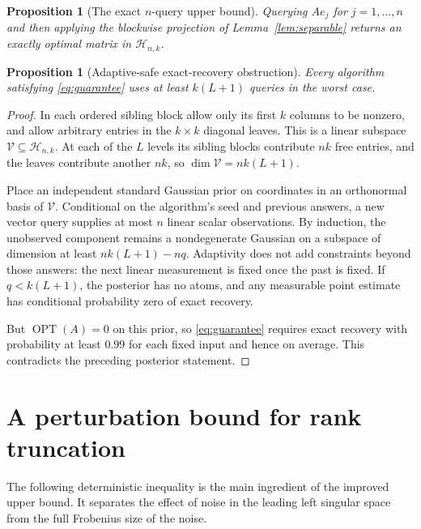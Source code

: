 \documentclass[11pt]{article}
\newtheorem{proposition}[theorem]{Proposition}
\theoremstyle{remark}
\newcommand{\Hclass}{\mathcal H_{n,k}}
\newcommand{\OPT}{\operatorname{OPT}}
\begin{document}
\begin{proposition}[The exact $n$-query upper bound]\label{prop:upper}
Querying $Ae_j$ for $j=1,\ldots,n$ and then applying the blockwise projection
of Lemma~\ref{lem:separable} returns an exactly optimal matrix in $\Hclass$.
\end{proposition}

\begin{proposition}[Adaptive-safe exact-recovery obstruction]\label{prop:exactlower}
Every algorithm satisfying \eqref{eq:guarantee} uses at least $k(L+1)$ queries
in the worst case.
\end{proposition}
\begin{proof}
In each ordered sibling block allow only its first $k$ columns to be nonzero,
and allow arbitrary entries in the $k\times k$ diagonal leaves. This is a
linear subspace $\mathcal V\subseteq\Hclass$. At each of the $L$ levels its
sibling blocks contribute $nk$ free entries, and the leaves contribute another
$nk$, so $\dim\mathcal V=nk(L+1)$.

Place an independent standard Gaussian prior on coordinates in an orthonormal
basis of $\mathcal V$. Conditional on the algorithm's seed and previous
answers, a new vector query supplies at most $n$ linear scalar observations.
By induction, the unobserved component remains a nondegenerate Gaussian on a
subspace of dimension at least $nk(L+1)-nq$. Adaptivity does not add
constraints beyond those answers: the next linear measurement is fixed once
the past is fixed. If $q<k(L+1)$, the posterior has no atoms, and any measurable
point estimate has conditional probability zero of exact recovery.

But $\OPT(A)=0$ on this prior, so \eqref{eq:guarantee} requires exact recovery
with probability at least $0.99$ for each fixed input and hence on average.
This contradicts the preceding posterior statement.
\end{proof}

\section{A perturbation bound for rank truncation}\label{sec:truncation}

The following deterministic inequality is the main ingredient of the improved
upper bound. It separates the effect of noise in the leading left singular
space from the full Frobenius size of the noise.
\end{document}
